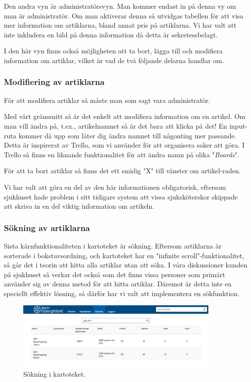 Den andra vyn är administratörsvyn.
Man kommer endast in på denna vy om man är administratör.
Om man aktiverar denna så utvidgas tabellen för att
visa mer information om artiklarna, bland annat pris på artiklarna.
Vi har valt att inte inkludera en bild på denna information
då detta är sekretessbelagt.

I den här vyn finns också möjligheten att ta bort, lägga till och modifiera
information om artiklar, vilket är vad de två följande delarna handlar om.

\clearpage
\subsubsection{Modifiering av artiklarna}
För att modifiera artiklar så måste man som sagt vara administratör.

Med vårt gränssnitt så är det enkelt att modifiera information om en artikel.
Om man vill ändra på, t.ex., artikelnamnet så är det bara att klicka på det!
En input-ruta kommer då upp som låter dig ändra namnet till någonting mer passande.
Detta är inspirerat av Trello, som vi använder för att organisera saker att göra.
I Trello så finns en liknande funktionalitet för att ändra namn på olika "\textit{Boards}".

För att ta bort artiklar så finns det ett smidig "X" till vänster om artikel-raden.

Vi har valt att göra en del av den här informationen obligatorisk, eftersom
sjukhuset hade problem i sitt tidigare system att vissa sjuksköterskor skippade
att skriva in en del viktig information om artikeln.


\subsubsection{Sökning av artiklarna}
Sista kärnfunktionaliteten i kartoteket är sökning.
Eftersom artiklarna är sorterade i bokstavsordning,
och kartoteket har en "infinite scroll"-funktionalitet,
så går det i teorin att hitta alla artiklar utan att söka.
I våra diskussioner kunden på sjukhuset så
verkar det också som det finns vissa personer som primärt använder
sig av denna metod för att hitta artiklar.
Däremot är detta inte en speciellt effektiv lösning, så därför
har vi valt att implementera en sökfunktion.

\begin{figure}[h!]
  \centering
  \includegraphics[width=0.9\textwidth]{images/site/kartsearch.png}
  \caption{Sökning i kartoteket.}
  \label{fig:kartsearch}
\end{figure}

